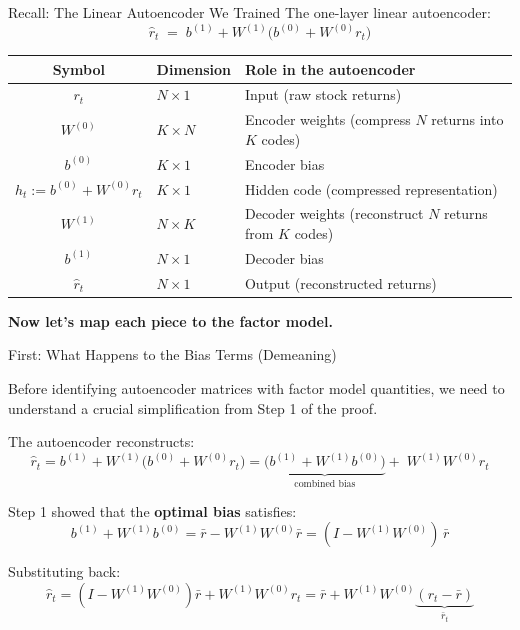 \documentclass[aspectratio=169]{beamer}
\begin{document}
\begin{frame}{Recall: The Linear Autoencoder We Trained}
\small
The one-layer linear autoencoder:
\[
\boxed{\hat{r}_t \;=\; b^{(1)} + W^{(1)}\!\bigl(b^{(0)} + W^{(0)} r_t\bigr)}
\]

\vspace{0.3em}

\begin{center}
\renewcommand{\arraystretch}{1.4}
\begin{tabular}{c l l}
\hline
\textbf{Symbol} & \textbf{Dimension} & \textbf{Role in the autoencoder} \\
\hline
$r_t$ & $N \times 1$ & Input (raw stock returns) \\
$W^{(0)}$ & $K \times N$ & Encoder weights (compress $N$ returns into $K$ codes) \\
$b^{(0)}$ & $K \times 1$ & Encoder bias \\
$h_t := b^{(0)} + W^{(0)} r_t$ & $K \times 1$ & Hidden code (compressed representation) \\
$W^{(1)}$ & $N \times K$ & Decoder weights (reconstruct $N$ returns from $K$ codes) \\
$b^{(1)}$ & $N \times 1$ & Decoder bias \\
$\hat{r}_t$ & $N \times 1$ & Output (reconstructed returns) \\
\hline
\end{tabular}
\end{center}

\vspace{0.3em}

\textbf{Now let's map each piece to the factor model.}

\end{frame}
%
%
\begin{frame}{First: What Happens to the Bias Terms (Demeaning)}

Before identifying autoencoder matrices with factor model quantities, we need to understand a crucial simplification from Step 1 of the proof.

\vspace{0.3em}

The autoencoder reconstructs:
\[
\hat{r}_t = b^{(1)} + W^{(1)}\bigl(b^{(0)} + W^{(0)} r_t\bigr) = \underbrace{\bigl(b^{(1)} + W^{(1)}b^{(0)}\bigr)}_{\text{combined bias}} + \; W^{(1)}W^{(0)} r_t
\]

\vspace{0.3em}

Step 1 showed that the \textbf{optimal bias} satisfies:
\[
b^{(1)} + W^{(1)}b^{(0)} = \bar{r} - W^{(1)}W^{(0)}\bar{r} = (I - W^{(1)}W^{(0)})\,\bar{r}
\]

Substituting back:
\[
\hat{r}_t = (I - W^{(1)}W^{(0)})\bar{r} + W^{(1)}W^{(0)} r_t = \bar{r} + W^{(1)}W^{(0)}\underbrace{(r_t - \bar{r})}_{\bar{r}_t}
\]
\end{frame}
\end{document}
